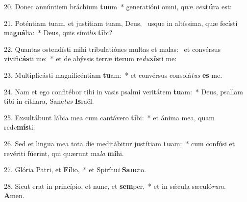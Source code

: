 20. Donec annúntiem bráchium \textbf{tu}um~*  generatióni omni, quæ \textit{ven}\textbf{tú}ra est:\

21. Poténtiam tuam, et justítiam tuam, Deus, \dag\  usque in altíssima, quæ fecísti ma\textbf{gná}lia:~*  Deus, quis sími\textit{lis} \textbf{ti}bi?\

22. Quantas ostendísti mihi tribulatiónes multas et malas: \dag\  et convérsus vivifi\textbf{cás}ti me:~*  et de abýssis terræ íterum re\textit{du}\textbf{xís}ti me:\

23. Multiplicásti magnificéntiam \textbf{tu}am:~*  et convérsus consolá\textit{tus} \textbf{es} me.\

24. Nam et ego confitébor tibi in vasis psalmi veritátem \textbf{tu}am:~*  Deus, psallam tibi in cíthara, Sanc\textit{tus} \textbf{Is}raël.\

25. Exsultábunt lábia mea cum cantávero \textbf{ti}bi:~*  et ánima mea, quam red\textit{e}\textbf{mís}ti.\

26. Sed et lingua mea tota die meditábitur justítiam \textbf{tu}am:~*  cum confúsi et revériti fúerint, qui quærunt ma\textit{la} \textbf{mi}hi.\

27. Glória Patri, et \textbf{Fí}lio,~*  et Spirítu\textit{i} \textbf{Sanc}to.\

28. Sicut erat in princípio, et nunc, et \textbf{sem}per,~*  et in sǽcula sæculó\textit{rum}. \textbf{A}men.\

